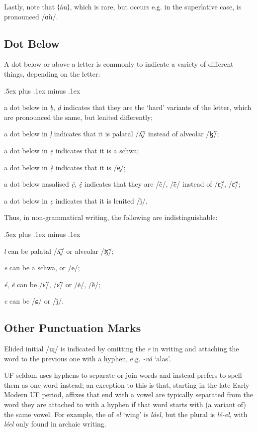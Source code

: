\documentclass[a4paper, 12pt, twoside, openright, final]{book}
\let \w \textit
\begin{document}
Lastly, note that ⟨áu⟩, which is rare, but occurs e.g. in the superlative case, is pronounced /ɑ̃u/.

\subsection{Dot Below}
A dot below or above a letter is commonly to indicate
a variety of different things, depending on the letter:
\begin{items}\itemsep .5ex plus .1ex minus .1ex\relax
\item a dot below in \w{ḅ}, \w{ḍ} indicates that they are the ‘hard’ variants of the letter, which are pronounced
      the same, but lenited differently;
\item a dot below in \w{ḷ} indicates that it is palatal /ʎ̝̃/ instead of alveolar /ɮ̃/;
\item a dot below in \w{ẹ} indicates that it is a schwa;
\item a dot below in \w{ẹ̀} indicates that it is /e̥/;
\item a dot below nasalised \w{ẹ́}, \w{ệ} indicates that they are /ẽ/, /ẽ̃/ instead of /ɛ̃/, /ɛ̃̃/;
\item a dot below in \w{c̣} indicates that it is lenited /j̊/.
\end{items}

\noindent Thus, in non-grammatical writing, the following are indistinguishable:
\begin{items}\itemsep .5ex plus .1ex minus .1ex\relax
\item \w{l} can be palatal /ʎ̝̃/ or alveolar /ɮ̃/;
\item \w{e} can be a schwa, or /e/;
\item \w{é}, \w{ê} can be /ɛ̃/, /ɛ̃̃/ or /ẽ/, /ẽ̃/;
\item \w{c} can be /ɕ/ or /j̊/.
\end{items}

\subsection{Other Punctuation Marks}
\noindent Elided initial /ɰ/ is indicated by omitting the \w{r} in writing and attaching the word to the previous one with a hyphen,
e.g. \w{-vá} ‘alas’.

UF seldom uses hyphens to separate or join words and instead prefers to spell them as one word instead; an exception
to this is that, starting in the late Early Modern UF period, affixes that end with a vowel are typically separated
from the word they are attached to with a hyphen if that word starts with (a variant of) the same vowel. For example,
the  of \w{el} ‘wing’ is \w{láel}, but the plural is \w{lé-el}, with \w{léel} only found in archaic
writing.
\end{document}
